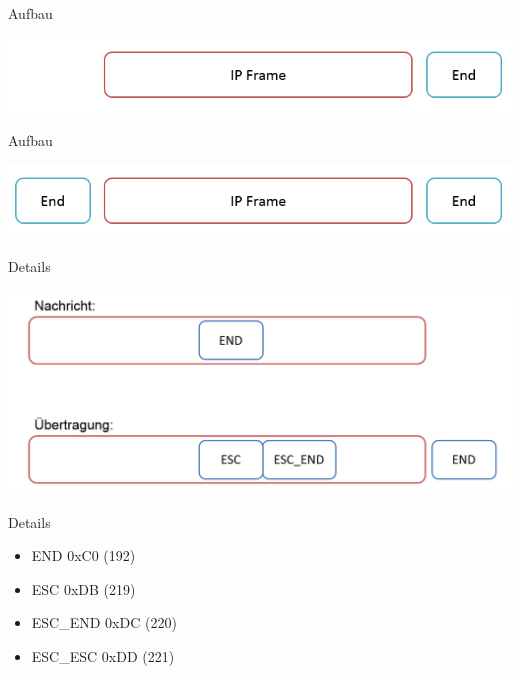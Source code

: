\documentclass[beamer]{uibk}
\begin{document}
\begin{frame}{Aufbau}
  \newpage
  \begin{center}
  \includegraphics[width=\textwidth,height=\textheight,keepaspectratio]{ip1.png}
  \end{center}
\end{frame}

\begin{frame}{Aufbau}
  \newpage
  \begin{center}
  \includegraphics[width=\textwidth,height=\textheight,keepaspectratio]{ip2.png}
  \end{center}
\end{frame}

\begin{frame}{Details}
  \newpage
  \begin{center}
  \includegraphics[width=\textwidth,height=\textheight,keepaspectratio]{escaping.png}
  \end{center}
\end{frame}

\begin{frame}{Details}
  \newpage
  \begin{center}
  \begin{itemize}
    \item END      \tabto{3cm} 0xC0 (192)
    \item ESC      \tabto{3cm} 0xDB (219)
    \item ESC\_END \tabto{3cm} 0xDC (220)
    \item ESC\_ESC \tabto{3cm} 0xDD (221)
  \end{itemize}
  \end{center}
\end{frame}
\end{document}
